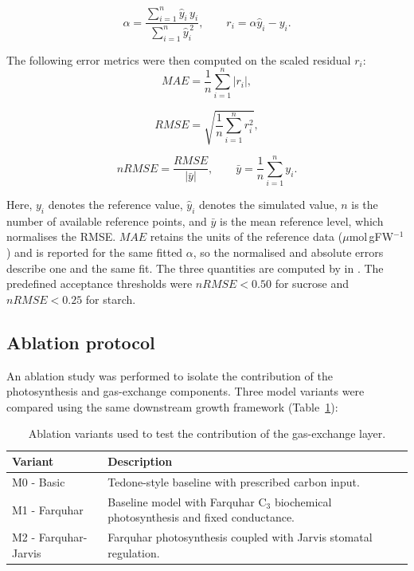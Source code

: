 \documentclass[a4paper,fleqn]{cas-sc}
\begin{document}
\begin{equation}
\alpha =
\frac{\sum_{i=1}^{n} \hat{y}_i \, y_i}
     {\sum_{i=1}^{n} \hat{y}_i^{\,2}},
\qquad
r_i = \alpha \hat{y}_i - y_i .
\end{equation}

The following error metrics were then computed on the scaled residual $r_i$:
\begin{equation}
MAE =
\frac{1}{n}
\sum_{i=1}^{n}
\left|
r_i
\right|,
\end{equation}

\begin{equation}
RMSE =
\sqrt{
\frac{1}{n}
\sum_{i=1}^{n}
r_i^2
},
\end{equation}

\begin{equation}
nRMSE =
\frac{RMSE}
{\left| \bar{y} \right|},
\qquad
\bar{y} = \frac{1}{n}\sum_{i=1}^{n} y_i .
\end{equation}

Here, $y_i$ denotes the reference value, $\hat{y}_i$ denotes the simulated
value, $n$ is the number of available reference points, and $\bar{y}$ is the
mean reference level, which normalises the RMSE. $MAE$ retains the units of
the reference data ($\mu$mol\,gFW$^{-1}$) and is reported for the same fitted
$\alpha$, so the normalised and absolute errors describe one and the same fit.
The three quantities are computed by \protect{} in
\protect{}. The predefined
acceptance thresholds were $nRMSE < 0.50$ for sucrose and $nRMSE < 0.25$ for
starch.

\subsection{Ablation protocol}

An ablation study was performed to isolate the contribution of the
photosynthesis and gas-exchange components. Three model variants were compared
using the same downstream growth framework (Table~\ref{tab:ablation_variants}):

\begin{table}[!htbp]
\centering
\caption{Ablation variants used to test the contribution of the gas-exchange layer.}
\label{tab:ablation_variants}
\begin{tabular}{ll}
\toprule
\textbf{Variant} & \textbf{Description} \\
\midrule
M0 - Basic &
Tedone-style baseline with prescribed carbon input. \\

M1 - Farquhar &
Baseline model with Farquhar C$_3$ biochemical photosynthesis
and fixed conductance. \\

M2 - Farquhar-Jarvis &
Farquhar photosynthesis coupled with Jarvis stomatal regulation. \\
\bottomrule
\end{tabular}
\end{table}
\end{document}

